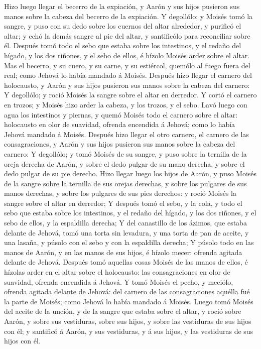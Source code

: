  Hizo luego llegar el becerro de la expiación, y Aarón y
sus hijos pusieron sus manos sobre la cabeza del becerro de la
expiación.  Y degollólo; y Moisés tomó la sangre, y puso
con su dedo sobre los cuernos del altar alrededor, y purificó el altar;
y echó la demás sangre al pie del altar, y santificólo para reconciliar
sobre él.  Después tomó todo el sebo que estaba sobre los
intestinos, y el redaño del hígado, y los dos riñones, y el sebo de
ellos, é hízolo Moisés arder sobre el altar.  Mas el
becerro, y su cuero, y su carne, y su estiércol, quemólo al fuego fuera
del real; como Jehová lo había mandado á Moisés.  Después
hizo llegar el carnero del holocausto, y Aarón y sus hijos pusieron sus
manos sobre la cabeza del carnero:  Y degollólo; y roció
Moisés la sangre sobre el altar en derredor.  Y cortó el
carnero en trozos; y Moisés hizo arder la cabeza, y los trozos, y el
sebo.  Lavó luego con agua los intestinos y piernas, y
quemó Moisés todo el carnero sobre el altar: holocausto en olor de
suavidad, ofrenda encendida á Jehová; como lo había Jehová mandado á
Moisés.  Después hizo llegar el otro carnero, el carnero de
las consagraciones, y Aarón y sus hijos pusieron sus manos sobre la
cabeza del carnero:  Y degollólo; y tomó Moisés de su
sangre, y puso sobre la ternilla de la oreja derecha de Aarón, y sobre
el dedo pulgar de su mano derecha, y sobre el dedo pulgar de su pie
derecho.  Hizo llegar luego los hijos de Aarón, y puso
Moisés de la sangre sobre la ternilla de sus orejas derechas, y sobre
los pulgares de sus manos derechas, y sobre los pulgares de sus pies
derechos: y roció Moisés la sangre sobre el altar en derredor;
 Y después tomó el sebo, y la cola, y todo el sebo que
estaba sobre los intestinos, y el redaño del hígado, y los dos riñones,
y el sebo de ellos, y la espaldilla derecha;  Y del
canastillo de los ázimos, que estaba delante de Jehová, tomó una torta
sin levadura, y una torta de pan de aceite, y una lasaña, y púsolo con
el sebo y con la espaldilla derecha;  Y púsolo todo en las
manos de Aarón, y en las manos de sus hijos, é hízolo mecer: ofrenda
agitada delante de Jehová.  Después tomó aquellas cosas
Moisés de las manos de ellos, é hízolas arder en el altar sobre el
holocausto: las consagraciones en olor de suavidad, ofrenda encendida á
Jehová.  Y tomó Moisés el pecho, y meciólo, ofrenda agitada
delante de Jehová: del carnero de las consagraciones aquélla fué la
parte de Moisés; como Jehová lo había mandado á Moisés. 
Luego tomó Moisés del aceite de la unción, y de la sangre que estaba
sobre el altar, y roció sobre Aarón, y sobre sus vestiduras, sobre sus
hijos, y sobre las vestiduras de sus hijos con él; y santificó á Aarón,
y sus vestiduras, y á sus hijos, y las vestiduras de sus hijos con él.


